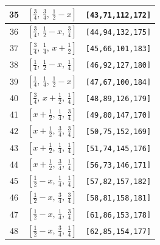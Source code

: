 \documentclass[fleqn,8pt]{jsarticle}
\begin{document}
\begin{longtable}{ccc}
35 & $\left[ \frac{3}{4},\, \frac{3}{4},\, \frac{1}{2} - x \right]$ & {\tt [43,71,112,172]} \\ \hline
36 & $\left[ \frac{3}{4},\, \frac{1}{2} - x,\, \frac{3}{4} \right]$ & {\tt [44,94,132,175]} \\ \hline
37 & $\left[ \frac{3}{4},\, \frac{1}{4},\, x + \frac{1}{2} \right]$ & {\tt [45,66,101,183]} \\ \hline
38 & $\left[ \frac{1}{4},\, \frac{1}{2} - x,\, \frac{1}{4} \right]$ & {\tt [46,92,127,180]} \\ \hline
39 & $\left[ \frac{1}{4},\, \frac{1}{4},\, \frac{1}{2} - x \right]$ & {\tt [47,67,100,184]} \\ \hline
40 & $\left[ \frac{3}{4},\, x + \frac{1}{2},\, \frac{1}{4} \right]$ & {\tt [48,89,126,179]} \\ \hline
41 & $\left[ x + \frac{1}{2},\, \frac{1}{4},\, \frac{3}{4} \right]$ & {\tt [49,80,147,170]} \\ \hline
42 & $\left[ x + \frac{1}{2},\, \frac{3}{4},\, \frac{3}{4} \right]$ & {\tt [50,75,152,169]} \\ \hline
43 & $\left[ x + \frac{1}{2},\, \frac{1}{4},\, \frac{1}{4} \right]$ & {\tt [51,74,145,176]} \\ \hline
44 & $\left[ x + \frac{1}{2},\, \frac{3}{4},\, \frac{1}{4} \right]$ & {\tt [56,73,146,171]} \\ \hline
45 & $\left[ \frac{1}{2} - x,\, \frac{1}{4},\, \frac{1}{4} \right]$ & {\tt [57,82,157,182]} \\ \hline
46 & $\left[ \frac{1}{2} - x,\, \frac{3}{4},\, \frac{3}{4} \right]$ & {\tt [58,81,158,181]} \\ \hline
47 & $\left[ \frac{1}{2} - x,\, \frac{1}{4},\, \frac{3}{4} \right]$ & {\tt [61,86,153,178]} \\ \hline
48 & $\left[ \frac{1}{2} - x,\, \frac{3}{4},\, \frac{1}{4} \right]$ & {\tt [62,85,154,177]} \\
\end{longtable}
\renewcommand{\arraystretch}{1.2}
\end{document}
